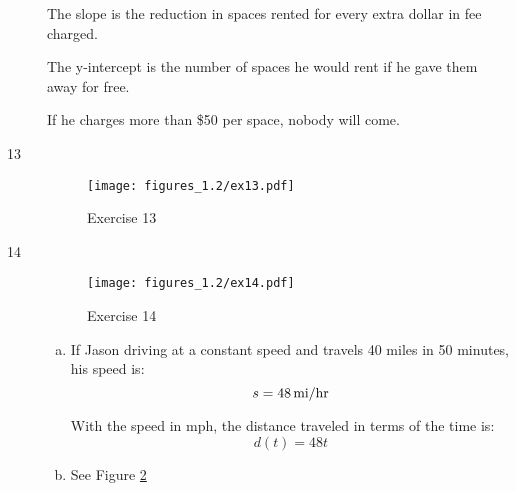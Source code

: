 \documentclass[letterpaper, landscape]{exam}
\newcommand{\dg}{\ensuremath{^\circ}}
\begin{document}
\begin{description}
        The slope is the reduction in spaces rented for every extra dollar in
        fee charged. 

        The y-intercept is the number of spaces he would rent if he gave them
        away for free.

        If he charges more than \$50 per space, nobody will come.

      \item[13] 
        \begin{figure}[H]
          \centering
          \texttt{[image: figures\_1.2/ex13.pdf]}
          \caption{Exercise 13}
          \label{fig:ex13}
        \end{figure}


      \item[14]
        \begin{figure}[H]
          \centering
          \texttt{[image: figures\_1.2/ex14.pdf]}
          \caption{Exercise 14}
          \label{fig:ex14}
        \end{figure}

        \begin{enumerate}[(a)]
          \item If Jason driving at a constant speed and travels 40 miles in 50
            minutes, his speed is: \[ s = \unit[48]{mi/hr} \]

            With the speed in mph, the distance traveled in terms of the time
            is:
            \[
              d(t) = 48t 
            \]

          \item See Figure \ref{fig:ex14}


\end{enumerate}
\end{description}
\end{document}
